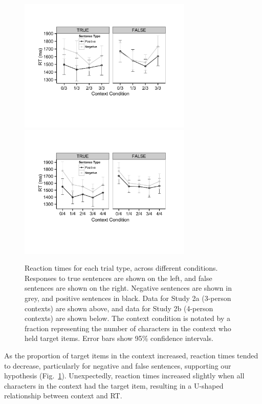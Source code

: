 \documentclass[10pt,letterpaper]{article}
\begin{document}
\begin{figure}[t]
\begin{center} 
\includegraphics[width=3.25in]{figures/study2a_linegraph.pdf}
\includegraphics[width=3.25in]{figures/study2b_linegraph.pdf}
\caption{\label{fig:e2line} Reaction times for each trial type, across different conditions. Responses to true sentences are shown on the left, and false sentences are shown on the right.  Negative sentences are shown in grey, and positive sentences in black.  Data for Study 2a (3-person contexts) are shown above, and data for Study 2b (4-person contexts) are shown below.  The context condition is notated by a fraction representing the number of characters in the context who held target items. Error bars show 95\% confidence intervals.  }
\end{center} 
\end{figure}

As the proportion of target items in the context increased, reaction times tended to decrease, particularly for negative and false sentences, supporting our hypothesis (Fig.\ \ref{fig:e2line}).  Unexpectedly, reaction times increased slightly when all characters in the context had the target item, resulting in a U-shaped relationship between context and RT.  
\end{document}

